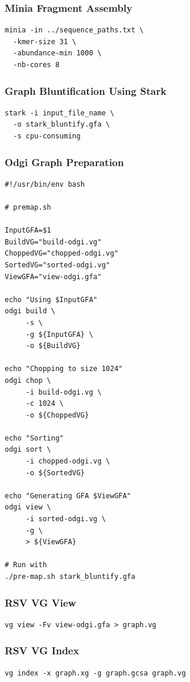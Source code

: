 \documentclass[10pt, a4paper]{article}
\begin{document}
\begin{appendices}
\subsubsection{Minia Fragment Assembly}
\label{sec:org54f01d2}
\begin{verbatim}
minia -in ../sequence_paths.txt \
  -kmer-size 31 \
  -abundance-min 1000 \
  -nb-cores 8
\end{verbatim}

\subsubsection{Graph Bluntification Using Stark}
\label{sec:orgd99df5b}
\begin{verbatim}
stark -i input_file_name \
  -o stark_bluntify.gfa \
  -s cpu-consuming
\end{verbatim}

\subsubsection{Odgi Graph Preparation}
\label{sec:org0bec5af}
\begin{verbatim}
#!/usr/bin/env bash

# premap.sh

InputGFA=$1
BuildVG="build-odgi.vg"
ChoppedVG="chopped-odgi.vg"
SortedVG="sorted-odgi.vg"
ViewGFA="view-odgi.gfa"

echo "Using $InputGFA"
odgi build \
     -s \
     -g ${InputGFA} \
     -o ${BuildVG}

echo "Chopping to size 1024"
odgi chop \
     -i build-odgi.vg \
     -c 1024 \
     -o ${ChoppedVG}

echo "Sorting"
odgi sort \
     -i chopped-odgi.vg \
     -o ${SortedVG}

echo "Generating GFA $ViewGFA"
odgi view \
     -i sorted-odgi.vg \
     -g \
     > ${ViewGFA}

# Run with
./pre-map.sh stark_bluntify.gfa
\end{verbatim}

\subsubsection{RSV VG View}
\label{sec:orge77ee86}
\begin{verbatim}
vg view -Fv view-odgi.gfa > graph.vg
\end{verbatim}

\subsubsection{RSV VG Index}
\label{sec:orgc91a242}
\begin{verbatim}
vg index -x graph.xg -g graph.gcsa graph.vg
\end{verbatim}


\end{appendices}
\end{document}
